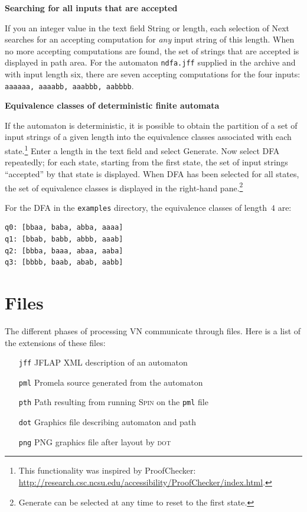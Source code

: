 \documentclass[11pt]{article}
\newcommand{\vn}{\textsc{VN}}
\newcommand{\dt}{\textsc{dot}}
\newcommand{\spn}{\textsc{Spin}}
\newcommand{\p}[1]{\texttt{#1}}
\newcommand{\bu}[1]{\textsf{#1}}
\begin{document}
\noindent\textbf{Searching for all inputs that are accepted}

If you an integer value in the text field \bu{String or length},
each selection of \bu{Next}
searches for an accepting computation for \emph{any} input string of
this length. When no more accepting computations are found,
the set of strings that are accepted is displayed in path area.
For the automaton \p{ndfa.jff} supplied in the archive and with input length six, 
there are seven accepting computations for the four inputs:
\p{aaaaaa, aaaabb, aaabbb, aabbbb}.

\bigskip
\bigskip

\noindent\textbf{Equivalence classes of deterministic finite automata}

If the automaton is  deterministic, it is possible to obtain
the partition of a set of input strings of a given length
into the equivalence classes 
associated with each state.\footnote{This functionality was inspired by \bu{ProofChecker}:\\ \hspace*{2cm}\url{http://research.csc.ncsu.edu/accessibility/ProofChecker/index.html}.}
Enter a length in the text field and select \bu{Generate}.
Now select \bu{DFA} repeatedly;
for each state, starting from the first state, the set of input strings ``accepted'' by that
state is displayed. When \bu{DFA} has been selected for all states,
the set of equivalence classes is displayed in the right-hand pane.\footnote{\bu{Generate} 
can be selected at any time to reset to the first state.}

For the DFA in the \p{examples} directory, the equivalence classes
of length~$4$ are:
\begin{verbatim}
q0: [bbaa, baba, abba, aaaa]
q1: [bbab, babb, abbb, aaab]
q2: [bbba, baaa, abaa, aaba]
q3: [bbbb, baab, abab, aabb]
\end{verbatim}

\section{Files}
The different phases of processing \vn{} communicate through files. Here is a
list of the extensions of these files:
\begin{itemize}
  \item[\p{jff}] JFLAP XML description of an automaton
  \item[\p{pml}] Promela source generated from the automaton
  \item[\p{pth}] Path resulting from running \spn{} on the \p{pml} file
  \item[\p{dot}] Graphics file describing automaton and path
  \item[\p{png}] \textsc{PNG} graphics file after layout by \dt{}
\end{itemize}
\end{document}
